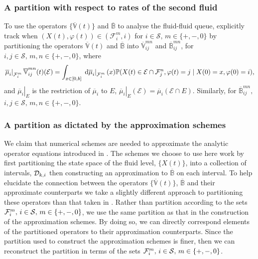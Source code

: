 \subsubsection{A partition with respect to rates of the second fluid}
To use the operators \(\{ \overline{\mathbb  V}(t)\}\) and \( \overline{\mathbb  B}\) to analyse the fluid-fluid queue, \cite{bo2014} explicitly track when \((X(t),\varphi(t))\in(\mathcal F_i^m,i)\) for \(i\in\mathcal S,\, m \in \{+,-,0\}\) by partitioning the operators \( \overline{\mathbb  V}(t)\) and \( \overline{\mathbb  B}\) into \( \overline{\mathbb  V}_{ij}^{m n}\) and \( \overline{\mathbb  B}_{ij}^{m n}\), for \(i,j\in\mathcal S,\, m,n\in \{+,-,0\}\), where
\[\left.\overline\mu_i\right|_{\mathcal{F}_i^m}  \overline{\mathbb  V}_{ij}^{m n}(t)(\mathcal{E}) = \int_{x\in[0,b]} \left. \, \mathrm{d} \overline\mu_i\right|_{\mathcal{F}_i^m}(x)\mathbb P (X(t) \in\mathcal{E}\cap \mathcal{F}_j^n,\varphi(t) = j \mid X(0) = x, \varphi(0) = i),\]
and \(\left.\overline\mu_i\right|_{E}\) is the restriction of \(\overline\mu_i\) to \(E\), \(\left.\overline\mu_i\right|_{E}(\mathcal E)=\overline\mu_i(\mathcal E\cap E)\). Similarly, for \( \overline{\mathbb  B}_{ij}^{m n},\) \(i,j\in\mathcal S,\, m,n\in \{+,-,0\}\).

\subsubsection{A partition as dictated by the approximation schemes}
We claim that numerical schemes are needed to approximate the analytic operator equations introduced in \cite{bo2014}. The schemes we choose to use here work by first partitioning the state space of the fluid level, \(\{X(t)\}\), into a collection of intervals, \({\mathcal{D}_{k,i}}\) then constructing an approximation to \(\overline{\mathbb B}\) on each interval. To help elucidate the connection between the operators \(\{ \overline{\mathbb  V}(t)\}\), \( \overline{\mathbb  B}\) and their approximate counterparts we take a slightly different approach to partitioning these operators than that taken in \cite{bo2014}. Rather than partition according to the sets \(\mathcal{F}_i^m,\,i\in\mathcal{S},\,m\in\{+,-,0\}\), we use the same partition as that in the construction of the approximation schemes. By doing so, we can directly correspond elements of the partitioned operators to their approximation counterparts. Since the partition used to construct the approximation schemes is finer, then we can reconstruct the partition in terms of the sets \(\mathcal{F}_i^m,\,i\in\mathcal{S},\,m\in\{+,-,0\}\). 

